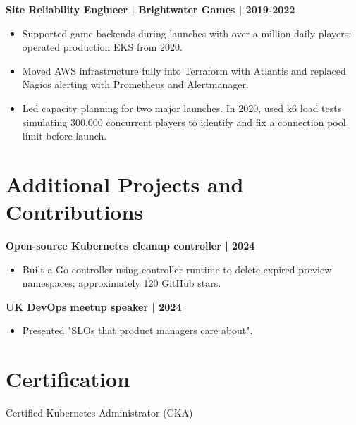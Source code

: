\documentclass[11pt,a4paper]{article}
\newcommand{\cvsection}[1]{\section*{#1}}
\begin{document}
\textbf{Site Reliability Engineer | Brightwater Games | 2019-2022}
\begin{itemize}
\item Supported game backends during launches with over a million daily players; operated production EKS from 2020.
\item Moved AWS infrastructure fully into Terraform with Atlantis and replaced Nagios alerting with Prometheus and Alertmanager.
\item Led capacity planning for two major launches. In 2020, used k6 load tests simulating 300,000 concurrent players to identify and fix a connection pool limit before launch.
\end{itemize}

\cvsection{Additional Projects and Contributions}
\textbf{Open-source Kubernetes cleanup controller | 2024}
\begin{itemize}
\item Built a Go controller using controller-runtime to delete expired preview namespaces; approximately 120 GitHub stars.
\end{itemize}
\textbf{UK DevOps meetup speaker | 2024}
\begin{itemize}
\item Presented "SLOs that product managers care about".
\end{itemize}

\cvsection{Certification}
Certified Kubernetes Administrator (CKA)
\end{document}
